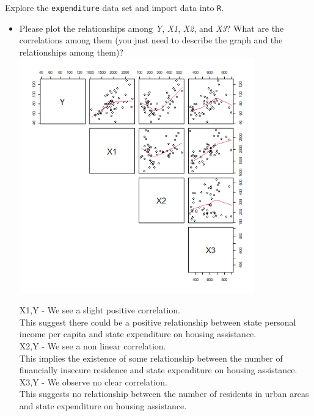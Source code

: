 \documentclass[12pt,letterpaper]{article}
\begin{document}
\vspace{.5cm}
\noindent Explore the \texttt{expenditure} data set and import data into \texttt{R}.
\vspace{.5cm}

\vspace{.5cm}

\begin{itemize}

\newpage
\item
Please plot the relationships among \emph{Y}, \emph{X1}, \emph{X2}, and \emph{X3}? What are the correlations among them (you just need to describe the graph and the relationships among them)?
\vspace{.5cm}
\includegraphics[width=0.8\textwidth]{images/pairs_plot.png}



X1,Y -  We see a slight positive correlation.\\
		This suggest there could be a positive relationship between state personal income per capita and state expenditure on housing assistance.\\
		

X2,Y - We see a non linear correlation.\\
		This implies the existence of some relationship between the number of financially insecure residence and state expenditure on housing assistance.\\
		

X3,Y - We observe no clear correlation.\\
		This suggests no relationship between the number of residents in urban areas and state expenditure on housing assistance.\\


\end{itemize}
\end{document}
